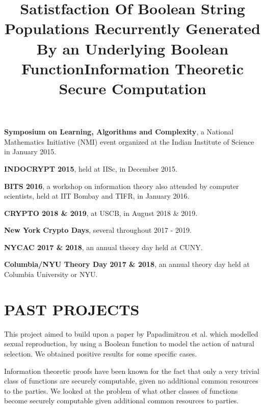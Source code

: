 \documentclass[margin]{res}
\begin{document}
\begin{resume}
\textbf{Symposium on Learning, Algorithms and Complexity}, a National Mathematics Initiative (NMI) event organized at the Indian Institute of Science in January 2015.
\par

\textbf{INDOCRYPT 2015},  held at IISc, in December 2015.

\textbf{BITS 2016}, a workshop on information theory also attended by computer scientists, held at IIT Bombay and TIFR, in January 2016.

\textbf{CRYPTO 2018 \& 2019},  at USCB, in August 2018 \& 2019.

\textbf{New York Crypto Days}, several throughout 2017 - 2019.

\textbf{NYCAC 2017 \& 2018}, an annual theory day held at CUNY.

\textbf{Columbia/NYU Theory Day 2017 \& 2018}, an annual theory day held at Columbia University or NYU.


\fi



\iffalse

\section{PAST PROJECTS}

\title{\textbf{Satistfaction Of Boolean String Populations Recurrently Generated By an Underlying Boolean Function}}
\begin{position}
This project aimed to build upon a paper by Papadimitrou et al. which modelled sexual reproduction, by using a Boolean function to model the action of natural selection. We obtained positive results for some specific cases.
\end{position}

\title{\textbf{Information Theoretic Secure Computation}}
\begin{position}
 Information theoretic proofs have been known for the fact that only a very trivial class of functions are securely computable, given no additional common resources to the parties. We looked at the problem of what other classes of functions become securely computable given additional common resources to parties.
\end{position}


\end{resume}
\end{document}
